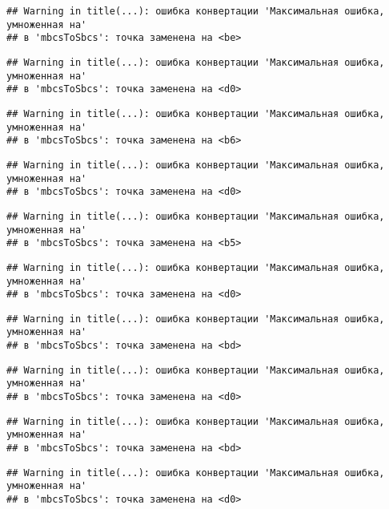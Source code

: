\documentclass[
]{article}
\begin{document}
\begin{verbatim}
## Warning in title(...): ошибка конвертации 'Максимальная ошибка, умноженная на'
## в 'mbcsToSbcs': точка заменена на <be>
\end{verbatim}

\begin{verbatim}
## Warning in title(...): ошибка конвертации 'Максимальная ошибка, умноженная на'
## в 'mbcsToSbcs': точка заменена на <d0>
\end{verbatim}

\begin{verbatim}
## Warning in title(...): ошибка конвертации 'Максимальная ошибка, умноженная на'
## в 'mbcsToSbcs': точка заменена на <b6>
\end{verbatim}

\begin{verbatim}
## Warning in title(...): ошибка конвертации 'Максимальная ошибка, умноженная на'
## в 'mbcsToSbcs': точка заменена на <d0>
\end{verbatim}

\begin{verbatim}
## Warning in title(...): ошибка конвертации 'Максимальная ошибка, умноженная на'
## в 'mbcsToSbcs': точка заменена на <b5>
\end{verbatim}

\begin{verbatim}
## Warning in title(...): ошибка конвертации 'Максимальная ошибка, умноженная на'
## в 'mbcsToSbcs': точка заменена на <d0>
\end{verbatim}

\begin{verbatim}
## Warning in title(...): ошибка конвертации 'Максимальная ошибка, умноженная на'
## в 'mbcsToSbcs': точка заменена на <bd>
\end{verbatim}

\begin{verbatim}
## Warning in title(...): ошибка конвертации 'Максимальная ошибка, умноженная на'
## в 'mbcsToSbcs': точка заменена на <d0>
\end{verbatim}

\begin{verbatim}
## Warning in title(...): ошибка конвертации 'Максимальная ошибка, умноженная на'
## в 'mbcsToSbcs': точка заменена на <bd>
\end{verbatim}

\begin{verbatim}
## Warning in title(...): ошибка конвертации 'Максимальная ошибка, умноженная на'
## в 'mbcsToSbcs': точка заменена на <d0>
\end{verbatim}
\end{document}
